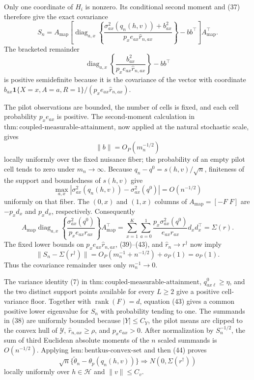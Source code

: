 Only one coordinate of \(H_i\) is nonzero. Its conditional second moment and (37) therefore give the exact covariance
\[
S_n=A_{\mathrm{map}}\left[
\operatorname{diag}_{a,x}\left\{
\frac{\sigma^2_{ax}(q_n(h,v))+b_{ax}^2}
{p_xe_{ax}\widehat r_{n,ax}}
\right\}-bb^\top\right]A_{\mathrm{map}}^\top.
\tag{39}
\]
The bracketed remainder
\[
\operatorname{diag}_{a,x}\left\{
\frac{b_{ax}^2}{p_xe_{ax}\widehat r_{n,ax}}
\right\}-bb^\top
\tag{40}
\]
is positive semidefinite because it is the covariance of the vector with coordinate \(b_{ax}\mathbf1\{X=x,A=a,R=1\}/(p_xe_{ax}\widehat r_{n,ax})\).

The pilot observations are bounded, the number of cells is fixed, and each cell probability \(p_xe_{ax}\) is positive. The second-moment calculation in \(\mathrm{thm:coupled\text{-}measurable\text{-}attainment}\), now applied at the natural stochastic scale, gives
\[
\lVert b\rVert=O_P(m_n^{-1/2})
\tag{41}
\]
locally uniformly over the fixed nuisance fiber; the probability of an empty pilot cell tends to zero under \(m_n\to\infty\). Because \(q_n-q^0=s(h,v)/\sqrt n\), finiteness of the support and boundedness of \(s(h,v)\) give
\[
\max_{a,x}|\sigma^2_{ax}(q_n(h,v))-\sigma^2_{ax}(q^0)|=O(n^{-1/2})
\tag{42}
\]
uniformly on that fiber. The \((0,x)\) and \((1,x)\) columns of \(A_{\mathrm{map}}=[-F\;F]\) are \(-p_xd_x\) and \(p_xd_x\), respectively. Consequently
\[
A_{\mathrm{map}}\operatorname{diag}_{a,x}\left\{
\frac{\sigma^2_{ax}(q^0)}{p_xe_{ax}r_{ax}}
\right\}A_{\mathrm{map}}^\top
=\sum_{x=1}^K\sum_{a=0}^1
\frac{p_x\sigma^2_{ax}(q^0)}{e_{ax}r_{ax}}d_xd_x^\top
=\Sigma(r).
\tag{43}
\]
The fixed lower bounds on \(p_xe_{ax}\widehat r_{n,ax}\), (39)--(43), and \(\widehat r_n\to r^\dagger\) now imply
\[
\lVert S_n-\Sigma(r^\dagger)\rVert
=O_P(m_n^{-1}+n^{-1/2})+o_P(1)=o_P(1).
\tag{44}
\]
Thus the covariance remainder uses only \(m_n^{-1}\to0\).

The variance identity (7) in \(\mathrm{thm:coupled\text{-}measurable\text{-}attainment}\), \(q^0_{ax\ell}\ge\eta\), and the two distinct support points available for every \(L\ge2\) give a positive cell-variance floor. Together with \(\operatorname{rank}(F)=d\), equation (43) gives a common positive lower eigenvalue for \(S_n\) with probability tending to one. The summands in (38) are uniformly bounded because \(|Y|\le C_Y\), the pilot means are clipped to the convex hull of \(\mathcal Y\), \(\widehat r_{n,ax}\ge\rho\), and \(p_xe_{ax}>0\). After normalization by \(S_n^{-1/2}\), the sum of third Euclidean absolute moments of the \(n\) scaled summands is \(O(n^{-1/2})\). Applying \(\mathrm{lem:bentkus\text{-}convex\text{-}set}\) and then (44) proves
\[
\sqrt n\{\widetilde\theta_n-\theta_p(q_n(h,v))\}
\Rightarrow N(0,\Sigma(r^\dagger))
\tag{45}
\]
locally uniformly over \(h\in\mathcal H\) and \(\lVert v\rVert\le C_v\).


